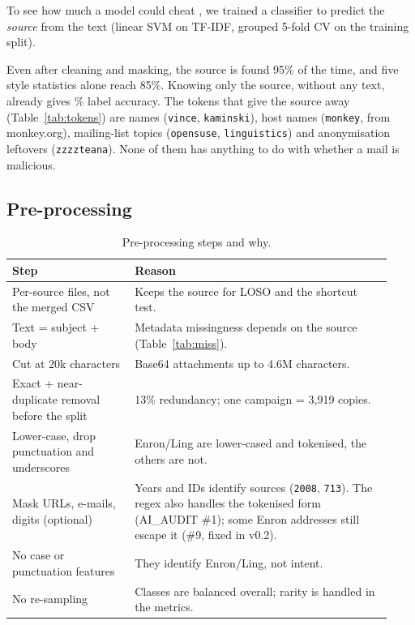 \documentclass[11pt,a4paper]{article}
\newcommand{\tab}[1]{}
\begin{document}
To see how much a model could cheat \cite{geirhos2020}, we trained a classifier to predict the \emph{source} from the text (linear SVM on TF-IDF, grouped 5-fold CV on the training split).
\begin{table}[H]\centering\small
\caption{How predictable is the source corpus? (chance = majority source)}\label{tab:shortcut}
\tab{tab_shortcut}
\end{table}
Even after cleaning and masking, the source is found 95\% of the time, and five style statistics alone reach 85\%. Knowing only the source, without any text, already gives \% label accuracy. The tokens that give the source away (Table~\ref{tab:tokens}) are names (\texttt{vince}, \texttt{kaminski}), host names (\texttt{monkey}, from monkey.org), mailing-list topics (\texttt{opensuse}, \texttt{linguistics}) and anonymisation leftovers (\texttt{zzzzteana}). None of them has anything to do with whether a mail is malicious.
\begin{table}[H]\centering\small
\caption{Top source-identifying tokens after cleaning and masking (one-vs-rest linear SVM).}\label{tab:tokens}
\tab{tab_top_tokens}
\end{table}

\subsection{Pre-processing}
\begin{table}[H]\centering\small
\caption{Pre-processing steps and why.}
\begin{tabular}{p{0.3\linewidth}p{0.63\linewidth}}
\toprule
Step & Reason \\
\midrule
Per-source files, not the merged CSV & Keeps the source for LOSO and the shortcut test. \\
Text = subject + body & Metadata missingness depends on the source (Table~\ref{tab:miss}). \\
Cut at 20k characters & Base64 attachments up to 4.6M characters. \\
Exact + near-duplicate removal before the split & 13\% redundancy; one campaign = 3,919 copies. \\
Lower-case, drop punctuation and underscores & Enron/Ling are lower-cased and tokenised, the others are not. \\
Mask URLs, e-mails, digits (optional) & Years and IDs identify sources (\texttt{2008}, \texttt{713}). The regex also handles the tokenised form (AI\_AUDIT \#1); some Enron addresses still escape it (\#9, fixed in v0.2). \\
No case or punctuation features & They identify Enron/Ling, not intent. \\
No re-sampling & Classes are balanced overall; rarity is handled in the metrics. \\
\bottomrule
\end{tabular}
\end{table}
\end{document}

